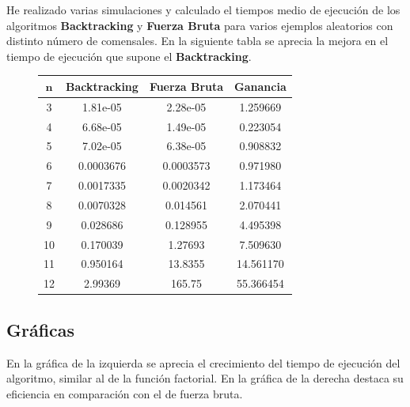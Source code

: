 \documentclass[a4]{article}
\begin{document}
He realizado varias simulaciones y calculado el tiempos medio de
ejecución de los algoritmos \textbf{Backtracking} y \textbf{Fuerza
  Bruta} para varios ejemplos aleatorios con distinto número de
comensales. En la siguiente tabla se aprecia la mejora en el
tiempo de ejecución que supone el \textbf{Backtracking}.

\begin{figure}[!hbp]
  \centering
  \label{tab:tiempos}
  \begin{tabular}{| c | c | c | c |}
    \hline
    \multicolumn{1}{|c|}{$\textbf{n}$}& \textbf{Backtracking}&
    \textbf{Fuerza Bruta}& \textbf{Ganancia} \\ \hline
     3 & 1.81e-05  & 2.28e-05  & 1.259669  \\ 
     4 & 6.68e-05  & 1.49e-05  & 0.223054  \\ 
     5 & 7.02e-05  & 6.38e-05  & 0.908832  \\ 
     6 & 0.0003676 & 0.0003573 & 0.971980  \\ 
     7 & 0.0017335 & 0.0020342 & 1.173464  \\ 
     8 & 0.0070328 & 0.014561  & 2.070441  \\ 
     9 & 0.028686  & 0.128955  & 4.495398  \\ 
    10 & 0.170039  & 1.27693   & 7.509630  \\ 
    11 & 0.950164  & 13.8355   & 14.561170 \\ 
    12 & 2.99369   & 165.75    & 55.366454 \\ \hline
  \end{tabular}
\end{figure}

\subsection{Gráficas}

En la gráfica de la izquierda se aprecia el crecimiento del tiempo de
ejecución del algoritmo, similar al de la función factorial. En la
gráfica de la derecha destaca su eficiencia en comparación con el de
fuerza bruta.
\end{document}
